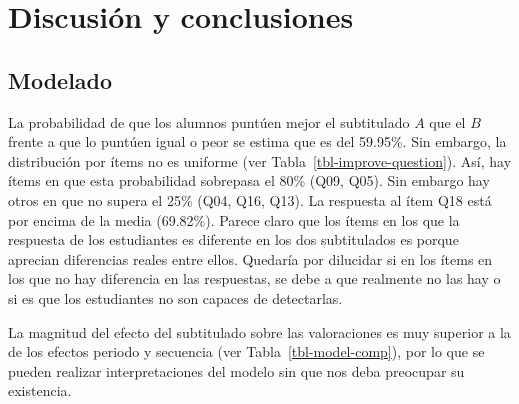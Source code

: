 \documentclass[
  12pt,
  a4paper,
  extrafontsizes,
  onecolumn,
  openright,
  table]{memoir}
\begin{document}

\hypertarget{sec-conclusiones}{%
\chapter{Discusión y conclusiones}\label{sec-conclusiones}}

\hypertarget{modelado-1}{%
\section{Modelado}\label{modelado-1}}

La probabilidad de que los alumnos puntúen mejor el subtitulado \(A\)
que el \(B\) frente a que lo puntúen igual o peor se estima que es del
59.95\%. Sin embargo, la distribución por ítems no es uniforme (ver
Tabla~\ref{tbl-improve-question}). Así, hay ítems en que esta
probabilidad sobrepasa el 80\% (Q09, Q05). Sin embargo hay otros en que
no supera el 25\% (Q04, Q16, Q13). La respuesta al ítem Q18 está por
encima de la media (69.82\%). Parece claro que los ítems en los que la
respuesta de los estudiantes es diferente en los dos subtitulados es
porque aprecian diferencias reales entre ellos. Quedaría por dilucidar
si en los ítems en los que no hay diferencia en las respuestas, se debe
a que realmente no las hay o si es que los estudiantes no son capaces de
detectarlas.

La magnitud del efecto del subtitulado sobre las valoraciones es muy
superior a la de los efectos periodo y secuencia (ver
Tabla~\ref{tbl-model-comp}), por lo que se pueden realizar
interpretaciones del modelo sin que nos deba preocupar su existencia.

\scriptsize

\normalsize
\end{document}
